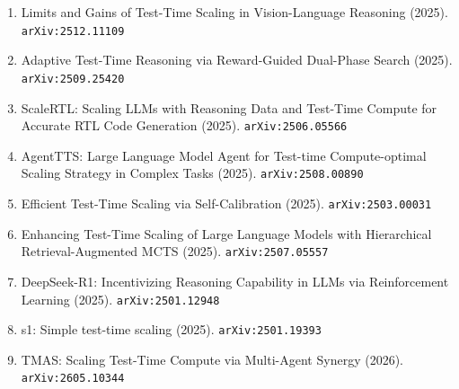 \documentclass[11pt]{article}
\begin{document}
\begin{enumerate}
  \item Limits and Gains of Test-Time Scaling in Vision-Language Reasoning (2025). \texttt{arXiv:2512.11109}
  \item Adaptive Test-Time Reasoning via Reward-Guided Dual-Phase Search (2025). \texttt{arXiv:2509.25420}
  \item ScaleRTL: Scaling LLMs with Reasoning Data and Test-Time Compute for Accurate RTL Code Generation (2025). \texttt{arXiv:2506.05566}
  \item AgentTTS: Large Language Model Agent for Test-time Compute-optimal Scaling Strategy in Complex Tasks (2025). \texttt{arXiv:2508.00890}
  \item Efficient Test-Time Scaling via Self-Calibration (2025). \texttt{arXiv:2503.00031}
  \item Enhancing Test-Time Scaling of Large Language Models with Hierarchical Retrieval-Augmented MCTS (2025). \texttt{arXiv:2507.05557}
  \item DeepSeek-R1: Incentivizing Reasoning Capability in LLMs via Reinforcement Learning (2025). \texttt{arXiv:2501.12948}
  \item s1: Simple test-time scaling (2025). \texttt{arXiv:2501.19393}
  \item TMAS: Scaling Test-Time Compute via Multi-Agent Synergy (2026). \texttt{arXiv:2605.10344}
\end{enumerate}
\end{document}
